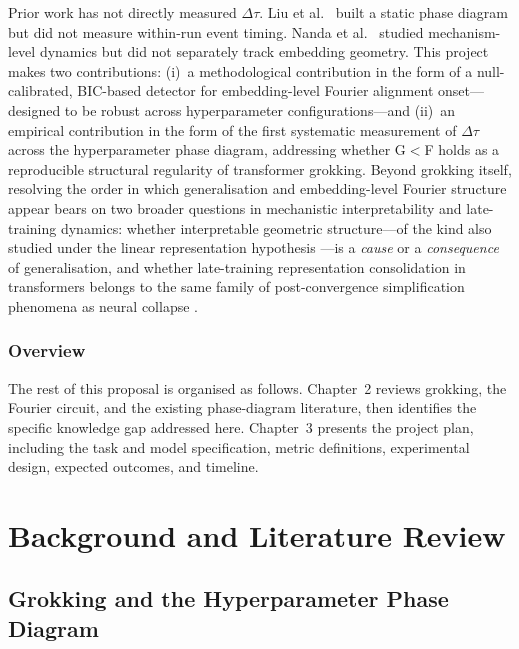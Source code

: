 \documentclass[12pt,openany,a4paper]{book}
\newcommand{\Dtau}{\Delta\tau}
\begin{document}
Prior work has not directly measured $\Dtau$.
Liu et al.\ \cite{liu2022towards} built a static phase diagram but did
not measure within-run event timing.
Nanda et al.\ \cite{nanda2023progress} studied mechanism-level dynamics
but did not separately track embedding geometry.
This project makes two contributions: (i)~a methodological contribution
in the form of a null-calibrated, BIC-based detector for embedding-level
Fourier alignment onset---designed to be robust across hyperparameter
configurations---and (ii)~an empirical contribution in the form of
the first systematic measurement of $\Dtau$ across the hyperparameter
phase diagram, addressing whether G$<$F holds as a reproducible
structural regularity of transformer grokking.
Beyond grokking itself, resolving the order in which generalisation
and embedding-level Fourier structure appear bears on two broader
questions in mechanistic interpretability and late-training dynamics:
whether interpretable geometric structure---of the kind also studied
under the linear representation hypothesis \cite{park2024linear}---is
a \emph{cause} or a \emph{consequence} of generalisation, and whether
late-training
representation consolidation in transformers belongs to the same
family of post-convergence simplification phenomena as neural collapse
\cite{papyan2020prevalence}.

\subsection{Overview}

The rest of this proposal is organised as follows.
Chapter~2 reviews grokking, the Fourier circuit, and the existing phase-diagram literature, then identifies the specific knowledge gap addressed here.
Chapter~3 presents the project plan, including the task and model specification, metric definitions, experimental design, expected outcomes, and timeline.

\chapter{Background and Literature Review}

\section{Grokking and the Hyperparameter Phase Diagram}
\end{document}
